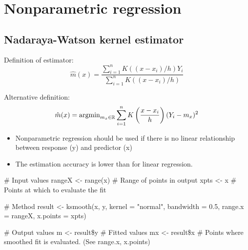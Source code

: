 \section{Nonparametric regression}
\subsection{Nadaraya-Watson kernel estimator}
\begin{theory}
 Definition of estimator:
 \begin{equation}
 \hat{m}(x) = \frac{\sum_{i=1}^n K((x-x_i)/h) Y_i}{\sum_{i=1}^n K((x-x_i)/h)}
 \end{equation}
 
 Alternative definition:
 \begin{equation}
 \hat{m}(x) = \operatorname{arg min}_{m_x \in \mathbb{R}} \sum_{i=1}^n K \left( \frac{x-x_i}{h} \right) (Y_i - m_x)^2
 \end{equation}
\end{theory}

\begin{application}
\begin{itemize}
 \item[\leftthumbsup] Nonparametric regression should be used if there is no linear relationship between response (y) and predictor (x)
 \item[\leftthumbsdown] The estimation accuracy is lower than for linear regression.
\end{itemize}
\end{application}

\begin{code}
 # Input values
 rangeX <- range(x) # Range of points in output
 xpts <- x # Points at which to evaluate the fit
 
 # Method
 result <- ksmooth(x, y, kernel = "normal", bandwidth = 0.5, range.x = rangeX, x.points = xpts)
 
 # Output values
 m <- result\$y # Fitted values
 mx <- result\$x # Points where smoothed fit is evaluated. (See range.x, x.points)
\end{code}

